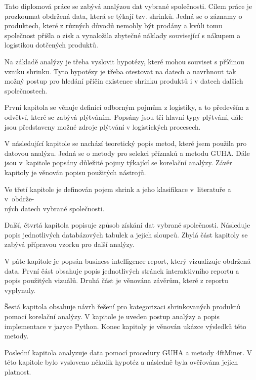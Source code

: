 Tato diplomová práce se zabývá analýzou dat vybrané společnosti. Cílem práce je prozkoumat obdržená data, která se týkají tzv. shrinků. Jedná se o záznamy o produktech, které z různých důvodů nemohly být prodány a kvůli tomu společnost přišla o zisk a vynaložila zbytečné náklady související s nákupem a logistikou dotčených produktů. 

Na základě analýzy je třeba vyslovit hypotézy, které mohou souviset s příčinou vzniku shrinku. Tyto hypotézy je třeba otestovat na datech a navrhnout tak možný postup pro hledání příčin existence shrinku produktů i v datech dalších společnostech. 


První kapitola se věnuje definici odborným pojmům z logistiky, a to především z odvětví, které se zabývá plýtváním. Popsány jsou tři hlavní typy plýtvání, dále jsou představeny možné zdroje plýtvání v logistických procesech.

V následující kapitole se nachází teoretický popis metod, které jsem použila pro datovou analýzu. Jedná se o metody pro selekci příznaků a metodu GUHA. Dále jsou v~kapitole popsány důležité pojmy týkající se korelační analýzy. Závěr kapitoly je věnován popisu použitých nástrojů.

Ve třetí kapitole je definován pojem shrink a jeho klasifikace v~literatuře a v~obdrže-\\ných datech vybrané společnosti.

Další, čtvrtá kapitola popisuje způsob získání dat vybrané společnosti. Následuje popis jednotlivých databázových tabulek a jejich sloupců. Zbylá část kapitoly se zabývá přípravou vzorku pro další analýzy.

V páte kapitole je popsán business intelligence report, který vizualizuje obdržená data. První část obsahuje popis jednotlivých stránek interaktivního reportu a popis použitých vizuálů. Druhá část je věnována závěrům, které z reportu vyplynuly.

Šestá kapitola obsahuje návrh řešení pro kategorizaci shrinkovaných produktů pomocí korelační analýzy. V kapitole je uveden postup analýzy a popis implementace v jazyce Python. Konec kapitoly je věnován ukázce výsledků této metody.

Poslední kapitola analyzuje data pomocí procedury GUHA a metody 4ftMiner. V této kapitole bylo vysloveno několik hypotéz a následně byla ověřována jejich platnost.






